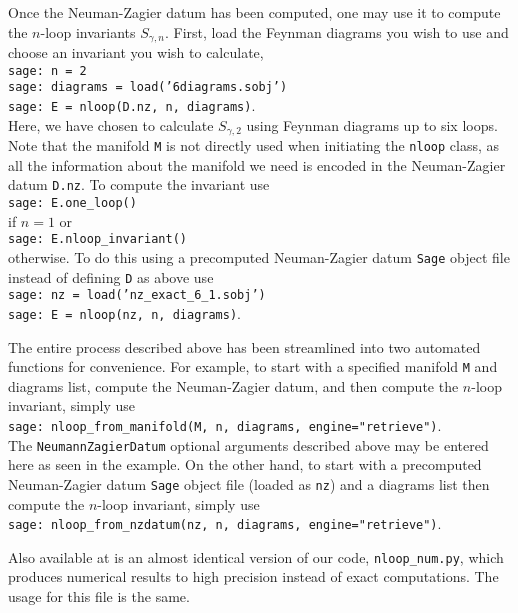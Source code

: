 \documentclass[12pt]{amsart}
\theoremstyle{definition}
\begin{document}
Once the Neuman-Zagier datum has been computed, one may use it to 
compute the $n$-loop invariants $S_{\gamma,n}$. First, load the Feynman
diagrams you wish to use and choose an invariant you wish to calculate,\\
\indent \texttt{sage: n = 2}\\
\indent \texttt{sage: diagrams = load('6diagrams.sobj')}\\
\indent \texttt{sage: E = nloop(D.nz, n, diagrams)}.\\
Here, we have chosen to calculate $S_{\gamma,2}$ using Feynman
diagrams up to six loops. Note that the manifold \texttt{M} is not directly used when
initiating the \texttt{nloop} class, as all the information about the manifold we
need is encoded in the Neuman-Zagier datum \texttt{D.nz}. To compute the
invariant use\\
\indent \texttt{sage: E.one\_loop()}\\
if $n = 1$ or\\
\indent \texttt{sage: E.nloop\_invariant()}\\
otherwise. To do this using a precomputed Neuman-Zagier datum \texttt{Sage}
object file instead of defining \texttt{D} as above use\\
\indent \texttt{sage: nz = load('nz\_exact\_6\_1.sobj')}\\
\indent \texttt{sage: E = nloop(nz, n, diagrams)}.

The entire process described above has been streamlined into two automated
functions for convenience. For example, to start with a specified manifold \texttt{M}
and diagrams list, compute the Neuman-Zagier datum, and then compute the
$n$-loop invariant, simply use\\
\indent \texttt{sage: nloop\_from\_manifold(M, n, diagrams,  engine="retrieve")}.\\
The \texttt{NeumannZagierDatum} optional arguments described above may be
entered here as seen in the example. On the other hand, to start with a
precomputed Neuman-Zagier datum \texttt{Sage} object file (loaded as \texttt{nz})
and a diagrams list then compute the $n$-loop invariant, simply use\\
\indent \texttt{sage: nloop\_from\_nzdatum(nz, n, diagrams,  engine="retrieve")}.

Also available at \cite{website} is an almost identical version of our code,
\texttt{nloop\_num.py}, which produces numerical results to high precision instead
of exact computations. The usage for this file is the same.
\end{document}
